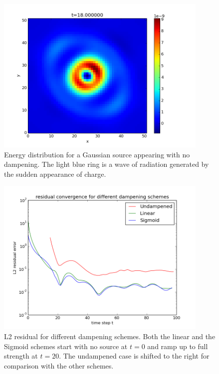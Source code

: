 \documentclass{article}
\begin{document}
	\begin{figure}
		\centering
		\includegraphics[width=4in]{shockwave}
		\caption{Energy distribution for a Gaussian source appearing with no dampening. The light blue ring is a wave of radiation generated by the sudden appearance of charge.}
		\label{fig:shockwave}
	\end{figure} 
	
	\begin{figure}
		\centering
		\includegraphics[width=4in]{conv_plot_100}
		\caption{L2 residual for different dampening schemes. Both the linear and the Sigmoid schemes start with no source at $t=0$ and ramp up to full strength at $t=20$. The undampened case is shifted to the right for comparison with the other schemes.}
		\label{fig:residual}
	\end{figure} 
	
\end{document}
